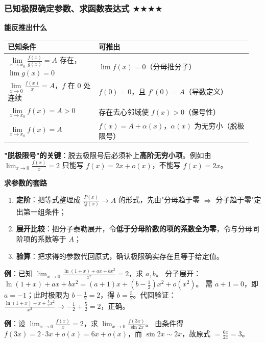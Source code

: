 \documentclass[11pt,openany,UTF8]{ctexbook}
\begin{document}
\subsubsection{已知极限确定参数、求函数表达式 $\bigstar$$\bigstar$$\bigstar$$\bigstar$}

\textbf{能反推出什么}

\begingroup\small\setlength{\tabcolsep}{4.0pt}
\begin{longtable}{@{}L{0.3513\linewidth}L{0.5944\linewidth}@{}}
\toprule
\textbf{已知条件} & \textbf{可推出} \\
\midrule
\endhead
$\lim\limits_{x\to x_0}\frac{f(x)}{g(x)}=A$ 存在，$\lim g(x)=0$ & $\lim f(x)=0$（分母推分子） \\
$\lim\limits_{x\to 0}\frac{f(x)}{x}=A$，$f$ 在 $0$ 处连续 & $f(0)=0$，且 $f'(0)=A$（导数定义） \\
$\lim\limits_{x\to x_0}f(x)=A>0$ & 存在去心邻域使 $f(x)>0$（保号性） \\
$\lim\limits_{x\to x_0}f(x)=A$ & $f(x)=A+\alpha(x)$，$\alpha(x)$ 为无穷小（脱极限号） \\
\bottomrule
\end{longtable}
\endgroup

\textbf{"脱极限号"的关键}：脱去极限号后必须补上\textbf{高阶无穷小项}。例如由 $\lim_{x\to 0}\frac{f(x)}{x}=2$ 只能写 $f(x)=2x+o(x)$，不能写 $f(x)=2x$。

\textbf{求参数的套路}

\begin{enumerate}
\item \textbf{定阶}：把等式整理成 $\frac{P(x)}{Q(x)}\to A$ 的形式，先由"分母趋于零 $\Rightarrow$ 分子趋于零"定出第一组条件；
\item \textbf{展开比较}：把分子泰勒展开，令\textbf{低于分母阶数的项的系数全为零}，令与分母同阶项的系数等于 $A$；
\item \textbf{验算}：把求得的参数代回原式，确认极限确实存在且等于给定值。
\end{enumerate}
\textbf{例}：已知 $\lim_{x\to 0}\frac{\ln(1+x)+ax+bx^{2}}{x^{2}}=2$，求 $a,b$。 分子展开：$\ln(1+x)+ax+bx^{2}=\left(a+1\right)x+\left(b-\frac12\right)x^{2}+o(x^{2})$。 需 $a+1=0$，即 $a=-1$；此时极限为 $b-\frac12=2$，得 $b=\frac52$。代回验证：$\frac{\ln(1+x)-x+\frac52x^{2}}{x^{2}}\to-\frac12+\frac52=2$，正确。

\textbf{例}：设 $\lim_{x\to 0}\frac{f(x)}{x}=2$，求 $\lim_{x\to 0}\frac{f(3x)}{\sin 2x}$。 由条件得 $f(3x)=2\cdot 3x+o(x)=6x+o(x)$，而 $\sin 2x\sim 2x$，故原式 $=\frac{6x}{2x}=3$。
\end{document}
